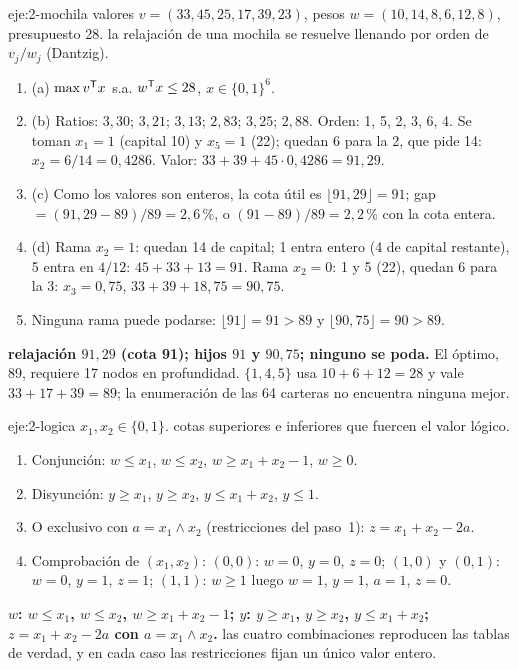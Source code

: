 \begin{solucion}{eje:2-mochila}
\datos valores $v=(33,45,25,17,39,23)$, pesos $w=(10,14,8,6,12,8)$, presupuesto 28.
\planteamiento la relajación de una mochila se resuelve llenando por orden de $v_j/w_j$ (Dantzig).
\pasos
\begin{enumerate}[label=\arabic*.]
  \item (a) $\max v^{\mathsf{T}} x$ s.a. $w^{\mathsf{T}} x\le 28$, $x\in\{0,1\}^{6}$.
  \item (b) Ratios: $3{,}30$; $3{,}21$; $3{,}13$; $2{,}83$; $3{,}25$; $2{,}88$. Orden: 1, 5, 2, 3, 6, 4. Se toman $x_1=1$ (capital 10) y $x_5=1$ (22); quedan 6 para la 2, que pide 14: $x_2=6/14=0{,}4286$. Valor: $33+39+45\cdot 0{,}4286=91{,}29$.
  \item (c) Como los valores son enteros, la cota útil es $\lfloor 91{,}29\rfloor=91$; gap $=(91{,}29-89)/89=2{,}6\,\%$, o $(91-89)/89=2{,}2\,\%$ con la cota entera.
  \item (d) Rama $x_2=1$: quedan 14 de capital; 1 entra entero (4 de capital restante), 5 entra en $4/12$: $45+33+13=91$. Rama $x_2=0$: 1 y 5 (22), quedan 6 para la 3: $x_3=0{,}75$, $33+39+18{,}75=90{,}75$.
  \item Ninguna rama puede podarse: $\lfloor 91\rfloor=91>89$ y $\lfloor 90{,}75\rfloor=90>89$.
\end{enumerate}
\resultado \textbf{relajación $91{,}29$ (cota 91); hijos $91$ y $90{,}75$; ninguno se poda.} El óptimo, 89, requiere 17 nodos en profundidad.
\comprobacion $\{1,4,5\}$ usa $10+6+12=28$ y vale $33+17+39=89$; la enumeración de las 64 carteras no encuentra ninguna mejor.
\end{solucion}

\begin{solucion}{eje:2-logica}
\datos $x_1,x_2\in\{0,1\}$.
\planteamiento cotas superiores e inferiores que fuercen el valor lógico.
\pasos
\begin{enumerate}[label=\arabic*.]
  \item Conjunción: $w\le x_1$, $w\le x_2$, $w\ge x_1+x_2-1$, $w\ge 0$.
  \item Disyunción: $y\ge x_1$, $y\ge x_2$, $y\le x_1+x_2$, $y\le 1$.
  \item O exclusivo con $a=x_1\wedge x_2$ (restricciones del paso~1): $z=x_1+x_2-2a$.
  \item Comprobación de $(x_1,x_2)$: $(0,0)$: $w=0$, $y=0$, $z=0$; $(1,0)$ y $(0,1)$: $w=0$, $y=1$, $z=1$; $(1,1)$: $w\ge 1$ luego $w=1$, $y=1$, $a=1$, $z=0$.
\end{enumerate}
\resultado \textbf{$w$: $w\le x_1$, $w\le x_2$, $w\ge x_1+x_2-1$; $y$: $y\ge x_1$, $y\ge x_2$, $y\le x_1+x_2$; $z=x_1+x_2-2a$ con $a=x_1\wedge x_2$.}
\comprobacion las cuatro combinaciones reproducen las tablas de verdad, y en cada caso las restricciones fijan un único valor entero.
\end{solucion}

